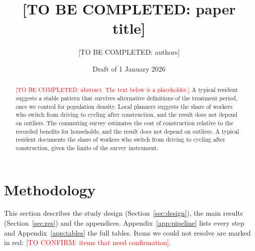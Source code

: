 \documentclass[11pt]{article}
\title{[TO BE COMPLETED: paper title]}
\author{[TO BE COMPLETED: authors]}
\date{Draft of 1 January 2026}
\newcommand{\toconfirm}[1]{\textcolor{red}{[TO CONFIRM: #1]}}
\newcommand{\tbc}[1]{\textcolor{red}{[TO BE COMPLETED: #1]}}
\begin{document}
\maketitle
\begin{abstract}\noindent
\tbc{abstract. The text below is a placeholder.}
A typical resident suggests a stable pattern that survives alternative definitions of the treatment period, once we control for population density. Local planners suggests the share of workers who switch from driving to cycling after construction, and the result does not depend on outliers. The commuting survey estimates the cost of construction relative to the recorded benefits for households, and the result does not depend on outliers. A typical resident documents the share of workers who switch from driving to cycling after construction, given the limits of the survey instrument.
\end{abstract}

\setcounter{section}{1}

\section{Methodology}\label{sec:method}

This section describes the study design (Section~\ref{sec:design}), the main results (Section~\ref{sec:res}) and the appendices. Appendix~\ref{app:pipeline} lists every step and Appendix~\ref{app:tables} the full tables. Items we could not resolve are marked in red: \toconfirm{items that need confirmation}.




\clearpage



\clearpage
\appendix

\clearpage

\clearpage

\end{document}
